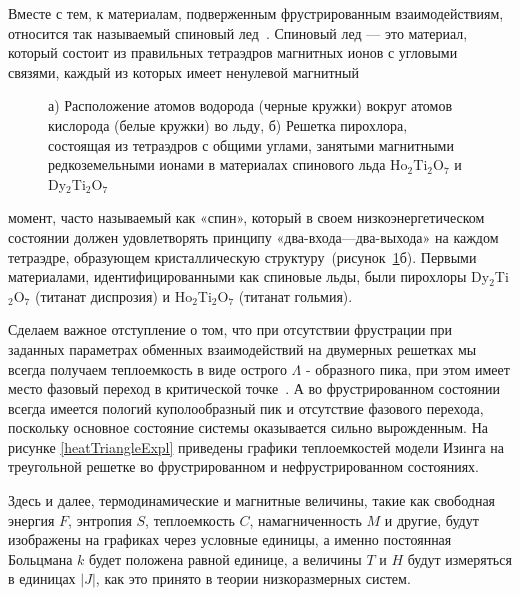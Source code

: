 Вместе с тем, к материалам, подверженным фрустрированным взаимодействиям, относится так называемый спиновый лед~\cite{diep2013,bramwell2001,kohli2011,harris1997}. Спиновый лед --- это материал, который состоит из правильных тетраэдров магнитных ионов с угловыми связями, каждый из которых имеет ненулевой магнитный

 \begin{figure}[h]
 	\begin{minipage}[h]{0.49\linewidth}
 	\end{minipage}
 	\hfill
 	\begin{minipage}[h]{0.49\linewidth}
 	\end{minipage}
 	\caption{а) Расположение атомов водорода (черные кружки) вокруг атомов кислорода (белые кружки) во льду, б) Решетка пирохлора, состоящая из тетраэдров с общими углами, занятыми магнитными редкоземельными ионами в материалах спинового льда Ho$_2$Ti$_2$O$_7$ и Dy$_2$Ti$_2$O$_7$~\cite{bramwell2001}}
 	\label{icePyroch}
 \end{figure}

\noindent момент, часто называемый как «спин», который в своем низкоэнергетическом состоянии должен удовлетворять принципу «два-входа---два-выхода» на каждом тетраэдре, образующем кристаллическую структуру~(рисунок~\ref{icePyroch}б). Первыми материалами, идентифицированными как спиновые льды, были пирохлоры Dy$_2$Ti$_2$O$_7$ (титанат диспрозия) и Ho$_2$Ti$_2$O$_7$ (титанат гольмия).

Сделаем важное отступление о том, что при отсутствии фрустрации при заданных параметрах обменных взаимодействий на двумерных решетках мы всегда получаем теплоемкость в виде острого $\Lambda$ - образного пика, при этом имеет место фазовый переход в критической точке~\cite{peierls1936}. А во фрустрированном состоянии всегда имеется пологий куполообразный пик и отсутствие фазового перехода, поскольку основное состояние системы оказывается сильно вырожденным. На рисунке \ref{heatTriangleExpl} приведены графики теплоемкостей модели Изинга на треугольной решетке во фрустрированном и нефрустрированном состояниях.

Здесь и далее, термодинамические и магнитные величины, такие как свободная энергия $F$, энтропия $S$, теплоемкость $C$, намагниченность $M$ и другие, будут изображены на графиках через условные единицы, а именно постоянная Больцмана $k$ будет положена равной единице, а величины $T$ и $H$ будут измеряться в единицах $|J|$, как это принято в теории низкоразмерных систем.

